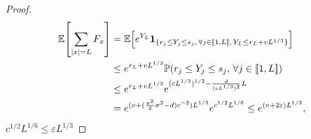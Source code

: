 \begin{proof}
{    }
    \begin{align*}
        \mathbb E\!\left[
            \sum_{|x|=L}
            F_x
        \right]
        &
        =
        \mathbb E\!\left[
            e^{Y_L}
            {\bf 1}_{
                \{
                    r_j\le Y_j\le s_j,\,
                    \forall j\in[\![1,L]\!],\,
                    Y_L\le r_L+vL^{1/3}
                \}
            }
        \right]
        \\ &
        \le
        e^{r_L+vL^{1/3}}
        \mathbb P(
            r_j\le Y_j\le s_j,\,
            \forall j\in[\![1,L]\!]
        )
        \\ &
        \le
        e^{r_L+vL^{1/3}}
        e^{(cL^{1/3})^{1/2}-\frac{d}{(cL^{1/3})^2}L}
        \\ &
        =
        e^{(v+(\frac{\pi^2}2\sigma^2-d)c^{-2})L^{1/3}}
        e^{c^{1/2}L^{1/6}}
        \le
        e^{(v+2\varepsilon)L^{1/3}},
    \end{align*}
    $%
        c^{1/2}L^{1/6}
        \le
        \varepsilon L^{1/3}
    $%


\end{proof}
